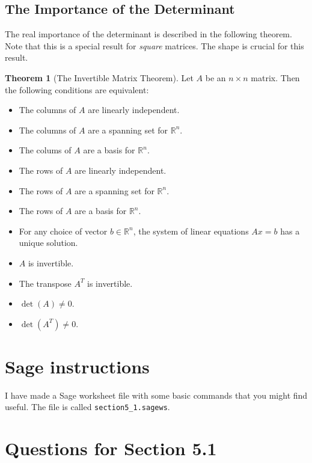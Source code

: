 \documentclass[11pt]{amsart}
\theoremstyle{definition}
\newtheorem*{theorem}{Theorem}
\begin{document}
\subsection{The Importance of the Determinant}

The real importance of the determinant is described in the following theorem. Note that this is a special result for \emph{square} matrices. The shape is crucial for this result.

\begin{theorem}[The Invertible Matrix Theorem]
Let $A$ be an $n\times n$ matrix. Then the following conditions are equivalent:
\begin{itemize}
\item The columns of $A$ are linearly independent.
\item The columns of $A$ are a spanning set for $\mathbb{R}^n$.
\item The colums of $A$ are a basis for $\mathbb{R}^n$.
\item The rows of $A$ are linearly independent.
\item The rows of $A$ are a spanning set for $\mathbb{R}^n$.
\item The rows of $A$ are a basis for $\mathbb{R}^n$.
\item For any choice of vector $b \in \mathbb{R}^n$, the system of linear equations $Ax = b$ has a unique solution.
\item $A$ is invertible.
\item The transpose $A^T$ is invertible.
\item $\det(A) \neq 0$.
\item $\det(A^T) \neq 0$.
\end{itemize}
\end{theorem}



\section{Sage instructions}

I have made a Sage worksheet file with some basic commands that you might find useful. The file is called \texttt{section5\_1.sagews}.


\section{Questions for Section 5.1}
\setcounter{exercise}{135}
\end{document}
